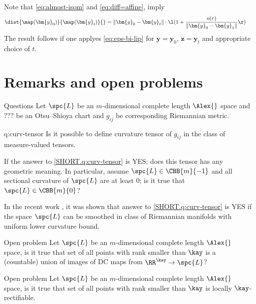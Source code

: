Note that \ref{eq:almost-isom} and \ref{eq:diff=affine}, imply 
\[
\begin{aligned}
\dist{\map(\bm{y}_0)}{\map(\bm{y}_t)}{}
&= \|\bm{y}_0-\bm{y}_t\|\cdot
\l(
1+\frac{o(r)}{\|\bm{y}_0-\bm{y}_1\|} 
\r)
\end{aligned}
\]
The result follows if one applyes \ref{eq:eps-bi-lip}
for $\bm{y}=\bm{y}_0$, $\bm{z}=\bm{y}_t$ and appropriate choice of $t$.
\qeds


\section{Remarks and open problems}

\begin{thm}{Questions}
Let $\spc{L}$ be an $m$-dimensional complete length $\Alex{}$ space and $???$ be an Otsu--Shioya chart
and $g_{ij}$ be corresponding Riemannian metric.
\begin{subthm}{q:curv-tensor}
Is it possible to define curvature tensor of $g_{ij}$ 
in the class of measure-valued tensors.
\end{subthm}

\begin{subthm}{} If the answer to \ref{SHORT.q:curv-tensor} is YES;
does this tensor has any geometric meaning.
In particular, assume $\spc{L}\in\CBB{m}{-1}$ and all sectional curvature of $\spc{L}$ are at least $0$; is it true that $\spc{L}\in\CBB{m}{0}$?
\end{subthm}
\end{thm}

In the recent work \cite{lebedeva-curv}, it was shown that answer to \ref{SHORT.q:curv-tensor} is YES if the space $\spc{L}$ can be smoothed in class of Riemannian manifolds with uniform lower curvature bound.


\begin{thm}{Open problem}
Let $\spc{L}$ be an $m$-dimensional complete length $\Alex{}$ space,
is it true that set of all points with rank smaller than $\kay$ is a (countable) union of images of DC maps from $\RR^\kay\to\spc{L}$? 
\end{thm}

\begin{thm}{Open problem}
Let $\spc{L}$ be an $m$-dimensional complete length $\Alex{}$ space,
is it true that set of all points with rank smaller than $\kay$ is locally $\kay$-rectifiable.
\end{thm}




